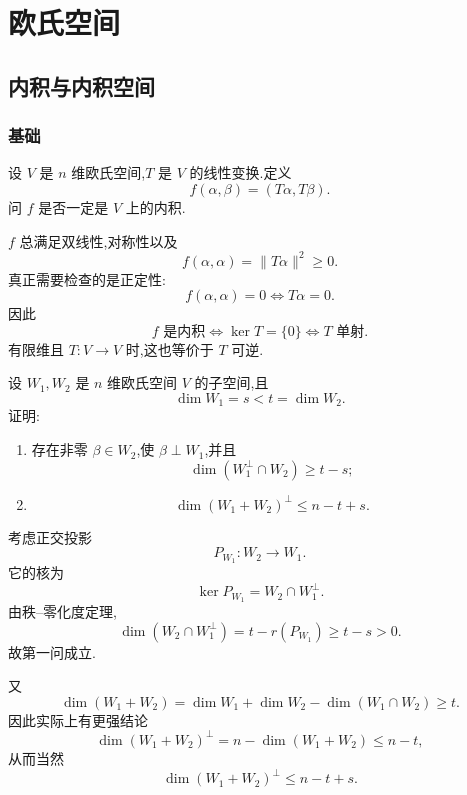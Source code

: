 \setcounter{chapter}{7}
\pagestyle{fancy}

\chapter{欧氏空间}

\section{内积与内积空间}

\subsection{基础}

\begin{example}
设 $V$ 是 $n$ 维欧氏空间,$T$ 是 $V$ 的线性变换.定义
\[
f(\alpha,\beta)=(T\alpha,T\beta).
\]
问 $f$ 是否一定是 $V$ 上的内积.
\end{example}
\exampleblank

\begin{solution}
$f$ 总满足双线性,对称性以及
\[
f(\alpha,\alpha)=\|T\alpha\|^2\ge0.
\]
真正需要检查的是正定性:
\[
f(\alpha,\alpha)=0
\iff
T\alpha=0.
\]
因此
\[
\boxed{f\text{ 是内积}\iff \ker T=\{0\}\iff T\text{ 单射}.}
\]
有限维且 $T:V\to V$ 时,这也等价于 $T$ 可逆.
\end{solution}


\begin{example}
设 $W_1,W_2$ 是 $n$ 维欧氏空间 $V$ 的子空间,且
\[
\dim W_1=s<t=\dim W_2.
\]
证明:
\begin{enumerate}
    \item 存在非零 $\beta\in W_2$,使 $\beta\perp W_1$,并且
    \[
    \dim(W_1^\perp\cap W_2)\ge t-s;
    \]
    \item
    \[
    \dim(W_1+W_2)^\perp\le n-t+s.
    \]
\end{enumerate}
\end{example}
\exampleblank

\begin{solution}
考虑正交投影
\[
P_{W_1}:W_2\to W_1.
\]
它的核为
\[
\ker P_{W_1}=W_2\cap W_1^\perp.
\]
由秩--零化度定理,
\[
\dim(W_2\cap W_1^\perp)
=t-r(P_{W_1})
\ge t-s>0.
\]
故第一问成立.

又
\[
\dim(W_1+W_2)
=
\dim W_1+\dim W_2-\dim(W_1\cap W_2)
\ge t.
\]
因此实际上有更强结论
\[
\dim(W_1+W_2)^\perp
=n-\dim(W_1+W_2)
\le n-t,
\]
从而当然
\[
\boxed{\dim(W_1+W_2)^\perp\le n-t+s}.
\]
\end{solution}


